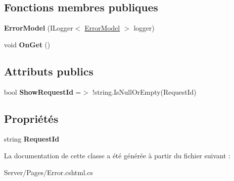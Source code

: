 \subsection*{Fonctions membres publiques}
\begin{DoxyCompactItemize}
\item 
\mbox{\label{class_mediwatch_1_1_server_1_1_pages_1_1_error_model_a6071f8072c63f30c32dac09a811f9ab3}} 
{\bfseries Error\+Model} (I\+Logger$<$ \hyperlink{class_mediwatch_1_1_server_1_1_pages_1_1_error_model}{Error\+Model} $>$ logger)
\item 
\mbox{\label{class_mediwatch_1_1_server_1_1_pages_1_1_error_model_afff141d7facfcb25a4a05e433cb18369}} 
void {\bfseries On\+Get} ()
\end{DoxyCompactItemize}
\subsection*{Attributs publics}
\begin{DoxyCompactItemize}
\item 
\mbox{\label{class_mediwatch_1_1_server_1_1_pages_1_1_error_model_a63bd289fd620d1418adcd60cc4ff7f53}} 
bool {\bfseries Show\+Request\+Id} =$>$ !string.\+Is\+Null\+Or\+Empty(Request\+Id)
\end{DoxyCompactItemize}
\subsection*{Propriétés}
\begin{DoxyCompactItemize}
\item 
\mbox{\label{class_mediwatch_1_1_server_1_1_pages_1_1_error_model_a6b1ab7a6328fa0b58ac9b76c0d8bfbef}} 
string {\bfseries Request\+Id}
\end{DoxyCompactItemize}


La documentation de cette classe a été générée à partir du fichier suivant \+:\begin{DoxyCompactItemize}
\item 
Server/\+Pages/Error.\+cshtml.\+cs\end{DoxyCompactItemize}
